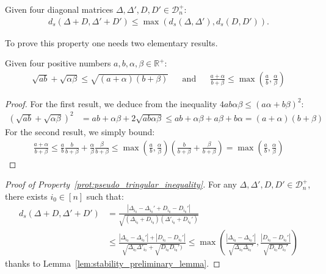\documentclass[a4papaer, titlepage]{book}
\begin{document}
\begin{property}\label{prot:pseudo_tringular_inequality}
  Given four diagonal matrices $\Delta,\Delta',D,D' \in \mathcal D_n^+$:
  \begin{align*}
     d_s(\Delta +D,  \Delta'+D') \leq \max(d_s(\Delta,  \Delta'), d_s(D, D')).
   \end{align*} 
\end{property}
To prove this property one needs two elementary results.
\begin{lemma}\label{lem:stability_preliminary_lemma}
  Given four positive numbers $a,b,\alpha, \beta \in \mathbb R^+$:
  \begin{align*}
    \sqrt{ab} + \sqrt{\alpha \beta} \leq \sqrt{(a+\alpha)(b+\beta)}&
    &\text{and}&
    &\frac{a+\alpha}{b+\beta} \leq \max \left(\frac{a}{b} ,\frac{\alpha}{\beta} \right)
  \end{align*}
\end{lemma}
\begin{proof}
  For the first result, we deduce from the inequality $4ab\alpha\beta \leq (a\alpha + b\beta)^2$:
  \begin{align*}
    \left(\sqrt{ab} + \sqrt{\alpha \beta}\right)^2 
    &= ab + \alpha \beta + 2\sqrt{ab\alpha\beta}
    \leq ab + \alpha \beta + a\beta + b\alpha = (a+\alpha)(b+\beta)
  \end{align*}
  For the second result, we simply bound:
  \begin{align*}
    \frac{a+\alpha}{b+\beta} \leq \frac{a}{b} \frac{b}{b+\beta} + \frac{\alpha}{\beta} \frac{\beta}{b+\beta} \leq \max \left(\frac{a}{b} ,\frac{\alpha}{\beta} \right) \left( \frac{b}{b+\beta} + \frac{\beta}{b+\beta} \right) = \max \left(\frac{a}{b} ,\frac{\alpha}{\beta} \right)
  \end{align*}
\end{proof}
\begin{proof}[Proof of Property~\ref{prot:pseudo_tringular_inequality}]
  For any $\Delta,\Delta',D,D' \in \mathcal D_n^+$, there exists $i_0 \in [n]$ such that:
  \begin{align*}
  d_s(\Delta+D, \Delta'+D')
    &= \frac{\left\vert \Delta_{i_0}- \Delta_{i_0}'+ D_{i_0}-D_{i_0}' \right\vert}{\sqrt{(\Delta_{i_0}+D_{i_0})(\Delta'_{i_0}+D_{i_0}')}}\\
    &\leq \frac{\left\vert \Delta_{i_0}-\Delta_{i_0}'\right\vert +\left\vert D_{i_0}-D_{i_0}' \right\vert}{\sqrt{\Delta_{i_0}\Delta'_{i_0}} +\sqrt{D_{i_0}D_{i_0}' })}
    \leq \max \left(\frac{\left\vert \Delta_{i_0}-\Delta_{i_0}'\right\vert}{\sqrt{\Delta_{i_0}\Delta_{i_0}'}}, \frac{\left\vert D_{i_0}-D_{i_0}' \right\vert}{\sqrt{D_{i_0}D_{i_0}'}}\right)
  \end{align*}
  thanks to Lemma~\ref{lem:stability_preliminary_lemma}.
\end{proof}
\end{document}
